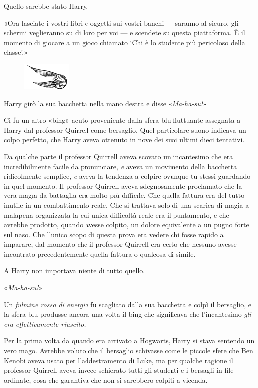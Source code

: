 Quello sarebbe stato Harry.

«Ora lasciate i vostri libri e oggetti sui vostri banchi — saranno al sicuro, gli schermi veglieranno su di loro per voi — e scendete su questa piattaforma. È il momento di giocare a un gioco chiamato ‘Chi è lo studente più pericoloso della classe’.»

\begin{figure}[h!]
        \includegraphics[scale=0.4]{boccino.png}
        \centering
\end{figure}

Harry girò la sua bacchetta nella mano destra e disse «\textit{Ma-ha-su!}»

Ci fu un altro «bing» acuto proveniente dalla sfera blu fluttuante assegnata a Harry dal professor Quirrell come bersaglio. Quel particolare suono indicava un colpo perfetto, che Harry aveva ottenuto in nove dei suoi ultimi dieci tentativi.

Da qualche parte il professor Quirrell aveva scovato un incantesimo che era incredibilmente facile da pronunciare, \textit{e} aveva un movimento della bacchetta ridicolmente semplice, \textit{e} aveva la tendenza a colpire ovunque tu stessi guardando in quel momento. Il professor Quirrell aveva sdegnosamente proclamato che la vera magia da battaglia era molto più difficile. Che quella fattura era del tutto inutile in un combattimento reale. Che si trattava solo di una scarica di magia a malapena organizzata la cui unica difficoltà reale era il puntamento, e che avrebbe prodotto, quando avesse colpito, un dolore equivalente a un pugno forte sul naso. Che l’unico scopo di questa prova era vedere chi fosse rapido a imparare, dal momento che il professor Quirrell era certo che nessuno avesse incontrato precedentemente quella fattura o qualcosa di simile.

A Harry non importava niente di tutto quello.

«\textit{Ma-ha-su!}»

Un \textit{fulmine rosso di energia} fu scagliato dalla sua bacchetta e colpì il bersaglio, e la sfera blu produsse ancora una volta il bing che significava che l’incantesimo \textit{gli era effettivamente riuscito.}

Per la prima volta da quando era arrivato a Hogwarts, Harry si stava sentendo un vero mago. Avrebbe voluto che il bersaglio schivasse come le piccole sfere che Ben Kenobi aveva usato per l’addestramento di Luke, ma per qualche ragione il professor Quirrell aveva invece schierato tutti gli studenti e i bersagli in file ordinate, cosa che garantiva che non si sarebbero colpiti a vicenda.

